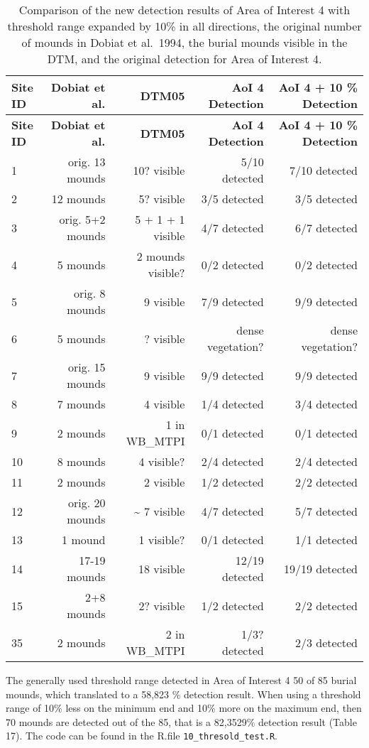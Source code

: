 \documentclass[
  12pt,
]{article}
\begin{document}
\begin{longtable}[]{@{}lrrrr@{}}
\caption{Comparison of the new detection results of Area of Interest 4 with threshold range expanded by 10\% in all directions, the original number of mounds in Dobiat et al.~1994, the burial mounds visible in the DTM, and the original detection for Area of Interest 4.}\tabularnewline
\toprule
\textbf{Site ID} & \textbf{Dobiat et al.} & \textbf{DTM05} & \textbf{AoI 4 Detection} & \textbf{AoI 4 + 10 \% Detection} \\
\midrule
\endfirsthead
\toprule
\textbf{Site ID} & \textbf{Dobiat et al.} & \textbf{DTM05} & \textbf{AoI 4 Detection} & \textbf{AoI 4 + 10 \% Detection} \\
\midrule
\endhead
1 & orig. 13 mounds & 10? visible & 5/10 detected & 7/10 detected \\
2 & 12 mounds & 5? visible & 3/5 detected & 3/5 detected \\
3 & orig. 5+2 mounds & 5 + 1 + 1 visible & 4/7 detected & 6/7 detected \\
4 & 5 mounds & 2 mounds visible? & 0/2 detected & 0/2 detected \\
5 & orig. 8 mounds & 9 visible & 7/9 detected & 9/9 detected \\
6 & 5 mounds & ? visible & dense vegetation? & dense vegetation? \\
7 & orig. 15 mounds & 9 visible & 9/9 detected & 9/9 detected \\
8 & 7 mounds & 4 visible & 1/4 detected & 3/4 detected \\
9 & 2 mounds & 1 in WB\_MTPI & 0/1 detected & 0/1 detected \\
10 & 8 mounds & 4 visible? & 2/4 detected & 2/4 detected \\
11 & 2 mounds & 2 visible & 1/2 detected & 2/2 detected \\
12 & orig. 20 mounds & \textasciitilde{} 7 visible & 4/7 detected & 5/7 detected \\
13 & 1 mound & 1 visible? & 0/1 detected & 1/1 detected \\
14 & 17-19 mounds & 18 visible & 12/19 detected & 19/19 detected \\
15 & 2+8 mounds & 2? visible & 1/2 detected & 2/2 detected \\
35 & 2 mounds & 2 in WB\_MTPI & 1/3? detected & 2/3 detected \\
\bottomrule
\end{longtable}

The generally used threshold range detected in Area of Interest 4 50 of 85 burial mounds, which translated to a 58,823 \% detection result. When using a threshold range of 10\% less on the minimum end and 10\% more on the maximum end, then 70 mounds are detected out of the 85, that is a 82,3529\% detection result (Table 17). The code can be found in the R.file \texttt{10\_thresold\_test.R}.
\end{document}
